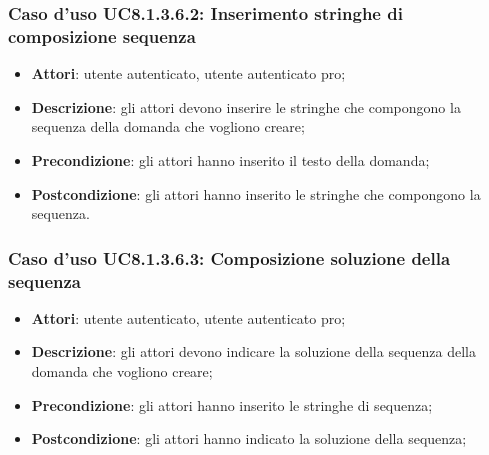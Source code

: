 \subsubsection{Caso d'uso UC8.1.3.6.2: Inserimento stringhe di composizione sequenza}
	\begin{itemize}
		\item \textbf{Attori}: utente autenticato, utente autenticato pro;
		\item \textbf{Descrizione}: gli attori devono inserire le stringhe che compongono la sequenza della domanda che vogliono creare;
		\item \textbf{Precondizione}: gli attori hanno inserito il testo della domanda;
		\item \textbf{Postcondizione}: gli attori hanno inserito le stringhe che compongono la sequenza.
	\end{itemize}
	
\subsubsection{Caso d'uso UC8.1.3.6.3: Composizione soluzione della sequenza}
	\begin{itemize}
		\item \textbf{Attori}: utente autenticato, utente autenticato pro;
		\item \textbf{Descrizione}: gli attori devono indicare la soluzione della sequenza della domanda che vogliono creare;
		\item \textbf{Precondizione}: gli attori hanno inserito le stringhe di sequenza;
		\item \textbf{Postcondizione}: gli attori hanno indicato la soluzione della sequenza; 
	\end{itemize}